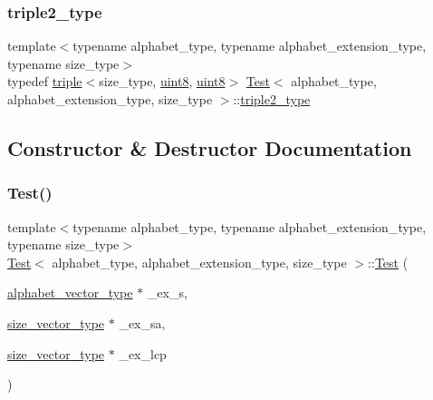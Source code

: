 \mbox{\label{class_test_ae1d42342f4ec472a724f55af01c3c5ab}} 
\subsubsection{\texorpdfstring{triple2\+\_\+type}{triple2\_type}}
{\footnotesize\ttfamily template$<$typename alphabet\+\_\+type, typename alphabet\+\_\+extension\+\_\+type, typename size\+\_\+type$>$ \\
typedef \hyperlink{structtriple}{triple}$<$size\+\_\+type, \hyperlink{types_8h_a115946cb5fc5879545e9ccea096a6031}{uint8}, \hyperlink{types_8h_a115946cb5fc5879545e9ccea096a6031}{uint8}$>$ \hyperlink{class_test}{Test}$<$ alphabet\+\_\+type, alphabet\+\_\+extension\+\_\+type, size\+\_\+type $>$\+::\hyperlink{class_test_ae1d42342f4ec472a724f55af01c3c5ab}{triple2\+\_\+type}\hspace{0.3cm}{\ttfamily [private]}}



\subsection{Constructor \& Destructor Documentation}
\mbox{\label{class_test_a9ca0652d8678a0c57e321fcc21f9ae39}} 
\subsubsection{\texorpdfstring{Test()}{Test()}}
{\footnotesize\ttfamily template$<$typename alphabet\+\_\+type, typename alphabet\+\_\+extension\+\_\+type, typename size\+\_\+type$>$ \\
\hyperlink{class_test}{Test}$<$ alphabet\+\_\+type, alphabet\+\_\+extension\+\_\+type, size\+\_\+type $>$\+::\hyperlink{class_test}{Test} (\begin{DoxyParamCaption}\item[{\hyperlink{class_test_aace52a5af52c5d5f457ec201881ab2ab}{alphabet\+\_\+vector\+\_\+type} $\ast$}]{\+\_\+ex\+\_\+s,  }\item[{\hyperlink{class_test_a9290f9f05f2aac6555e7366cf214d186}{size\+\_\+vector\+\_\+type} $\ast$}]{\+\_\+ex\+\_\+sa,  }\item[{\hyperlink{class_test_a9290f9f05f2aac6555e7366cf214d186}{size\+\_\+vector\+\_\+type} $\ast$}]{\+\_\+ex\+\_\+lcp }\end{DoxyParamCaption})\hspace{0.3cm}{\ttfamily [inline]}}



